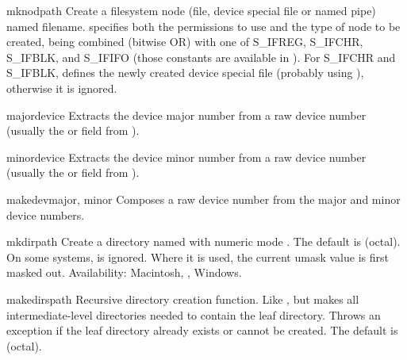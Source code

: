 \begin{funcdesc}{mknod}{path}
Create a filesystem node (file, device special file or named pipe)
named filename.  specifies both the permissions to use and
the type of node to be created, being combined (bitwise OR) with one
of S_IFREG, S_IFCHR, S_IFBLK, and S_IFIFO (those constants are
available in ). For S_IFCHR and S_IFBLK, 
defines the newly created device special file (probably using
), otherwise it is ignored.
\end{funcdesc}

\begin{funcdesc}{major}{device}
Extracts the device major number from a raw device number (usually
the  or  field from ).
\end{funcdesc}

\begin{funcdesc}{minor}{device}
Extracts the device minor number from a raw device number (usually
the  or  field from ).
\end{funcdesc}

\begin{funcdesc}{makedev}{major, minor}
Composes a raw device number from the major and minor device numbers.
\end{funcdesc}

\begin{funcdesc}{mkdir}{path}
Create a directory named  with numeric mode .
The default  is  (octal).  On some systems,
 is ignored.  Where it is used, the current umask value is
first masked out.
Availability: Macintosh, \UNIX, Windows.
\end{funcdesc}

\begin{funcdesc}{makedirs}{path}
Recursive directory creation function.
Like ,
but makes all intermediate-level directories needed to contain the
leaf directory.  Throws an  exception if the leaf
directory already exists or cannot be created.  The default 
is  (octal).
\end{funcdesc}

